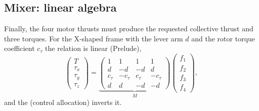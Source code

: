 \subsection{Mixer: linear algebra}
Finally, the four motor thrusts must produce the requested collective thrust and three torques. For the X-shaped frame with the lever arm $d$ and the rotor torque coefficient $c_\tau$ the relation is linear (Prelude),
\begin{equation}\label{eq:cascade-mixer}
  \begin{pmatrix}T\\ \tau_x\\ \tau_y\\ \tau_z\end{pmatrix} =
  \underbrace{\begin{pmatrix}
    1 & 1 & 1 & 1\\
    d & -d & -d & d\\
    c_\tau & -c_\tau & c_\tau & -c_\tau\\
    d & d & -d & -d
  \end{pmatrix}}_{M}
  \begin{pmatrix}f_1\\ f_2\\ f_3\\ f_4\end{pmatrix},
\end{equation}
and the  (control allocation) inverts it.

